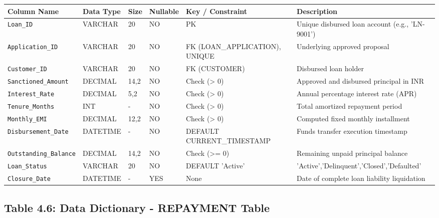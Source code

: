 \documentclass[12pt,a4paper,oneside]{report}
\begin{document}
\begin{table}[htbp]
\centering
\small
\begin{tabularx}{\textwidth}{p{2.5cm} X X X X X}
\toprule
\textbf{Column Name} & \textbf{Data Type} & \textbf{Size} & \textbf{Nullable} & \textbf{Key / Constraint} & \textbf{Description} \\
\midrule
\texttt{Loan\_ID} & VARCHAR & 20 & NO & PK & Unique disbursed loan account (e.g., 'LN-9001') \\
\texttt{Application\_ID} & VARCHAR & 20 & NO & FK (LOAN\_APPLICATION), UNIQUE & Underlying approved proposal \\
\texttt{Customer\_ID} & VARCHAR & 20 & NO & FK (CUSTOMER) & Disbursed loan holder \\
\texttt{Sanctioned\_Amount} & DECIMAL & 14,2 & NO & Check (> 0) & Approved and disbursed principal in INR \\
\texttt{Interest\_Rate} & DECIMAL & 5,2 & NO & Check (> 0) & Annual percentage interest rate (APR) \\
\texttt{Tenure\_Months} & INT & - & NO & Check (> 0) & Total amortized repayment period \\
\texttt{Monthly\_EMI} & DECIMAL & 12,2 & NO & Check (> 0) & Computed fixed monthly installment \\
\texttt{Disbursement\_Date} & DATETIME & - & NO & DEFAULT CURRENT\_TIMESTAMP & Funds transfer execution timestamp \\
\texttt{Outstanding\_Balance} & DECIMAL & 14,2 & NO & Check (>= 0) & Remaining unpaid principal balance \\
\texttt{Loan\_Status} & VARCHAR & 20 & NO & DEFAULT 'Active' & 'Active','Delinquent','Closed','Defaulted' \\
\texttt{Closure\_Date} & DATETIME & - & YES & None & Date of complete loan liability liquidation \\
\bottomrule
\end{tabularx}
\end{table}

\subsection{Table 4.6: Data Dictionary - REPAYMENT Table}
\end{document}
